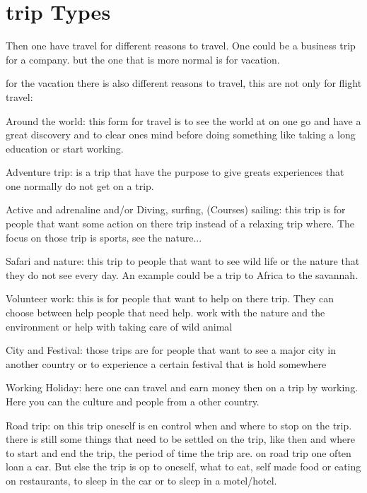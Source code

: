\section{trip Types}
Then one have travel for different reasons to travel.
One could be a business trip for a company. but the one that is more normal is for vacation.

for the vacation there is also different reasons to travel, this are not only for flight travel:

Around the world:
this form for travel is to see the world at on one go and have a great discovery and to clear ones mind before doing something like taking a long education or start working.

Adventure trip:
is a trip that have the purpose to give greats experiences that one normally do not get on a trip.

Active and adrenaline and/or Diving, surfing, (Courses) sailing:
this trip is for people that want some action on there trip instead of a relaxing trip where. The focus on those trip is sports, see the nature...

Safari and nature:
this trip to people that want to see wild life or the nature that they do not see every day. An example could be a trip to Africa to the savannah.

Volunteer work:
this is for people that want to help on there trip. They can choose between help people that need help. work with the nature and the environment or help with taking care of wild animal

City and Festival:
those trips are for people that want to see a major city in another country or to experience a certain festival that is hold somewhere 

Working Holiday:
here one can travel and earn money then on a trip by working. Here you can the culture and people from a other country. 

Road trip:
on this trip oneself is en control when and where to stop on the trip. there is still some things that need to be settled on the trip, like then and where to start and end the trip, the period of time the trip are. on road trip one often loan a car. But else the trip is op to oneself, what to eat, self made food or eating on restaurants, to sleep in the car or to sleep in a motel/hotel.


